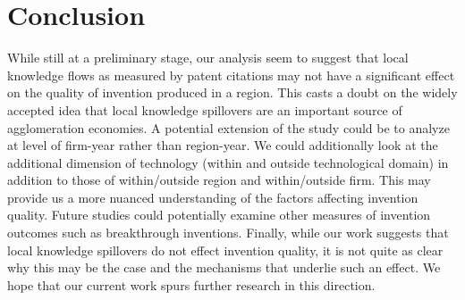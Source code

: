 \documentclass[10pt,letterpaper]{article}
\begin{document}
\section*{Conclusion}
While still at a preliminary stage, our analysis seem to suggest that local knowledge flows as measured by patent citations may not have a significant effect on the quality of invention produced in a region. This casts a doubt on the widely accepted idea that local knowledge spillovers are an important source of agglomeration economies. A potential extension of the study could be to analyze at level of firm-year rather than region-year. We could additionally look at the additional dimension of technology (within and outside technological domain) in addition to those of within/outside region and within/outside firm. This may provide us a more nuanced understanding of the factors affecting invention quality. Future studies could potentially examine other measures of invention outcomes such as breakthrough inventions. Finally, while our work suggests that local knowledge spillovers do not effect invention quality, it is not quite as clear why this may be the case and the mechanisms that underlie such an effect. We hope that our current work spurs further research in this direction.  

\singlespacing
 

\newpage


\end{document}
